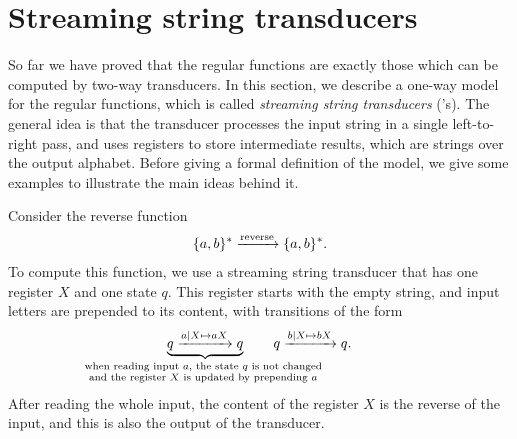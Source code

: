 \section{Streaming string transducers}
\label{sec:sst}
So far we have proved that the regular functions are exactly those which can be computed by two-way transducers. In this section, we describe a one-way model for the regular functions, which is called \emph{streaming string transducers} (\sst's).  The general idea is that the transducer processes the input string in a single left-to-right pass, and uses registers to store intermediate results, which are strings over the output alphabet. Before giving a formal definition of the model, we give some examples to illustrate the main ideas behind it.

\begin{myexample}[Reverse]
    \label{example:reverse-function-sst}
    Consider the reverse function 
    \begin{align*}
    \{a,b\}^* 
    \xrightarrow {\text{reverse}}
    \{a,b\}^*.
    \end{align*}
    To compute this function, we use a streaming string transducer that has one register $X$ and one state $q$. This register starts with the empty string, and input letters are prepended to its content, with transitions of the form
    \begin{align*}
      \myunderbrace{q
        \xrightarrow {a \mid X \mapsto aX}
        q}{when reading input $a$, the state $q$ is not changed \\ and the register $X$ is updated by prepending $a$} \qquad
        q   
        \xrightarrow {b \mid X \mapsto bX}
        q.
    \end{align*}
    After reading the whole input, the content of the register $X$ is the reverse of the input, and this is also the output of the transducer.
\end{myexample}

